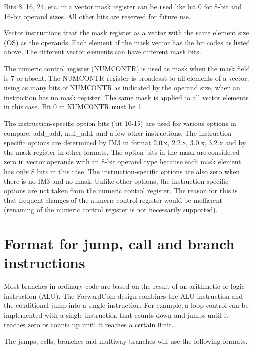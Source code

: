 \documentclass[forwardcom.tex]{subfiles}
\begin{document}
Bits 8, 16, 24, etc. in a vector mask register can be used like bit 0 for 8-bit and 16-bit operand sizes. All other bits are reserved for future use.
\vspace{2mm}

Vector instructions treat the mask register as a vector with the same element size (OS) as the operands. Each element of the mask vector has the bit codes as listed above. The different vector elements can have different mask bits.
\vspace{2mm}

The numeric control register (NUMCONTR) is used as mask when the mask field is 7 or absent. The NUMCONTR register is broadcast to all elements of a vector, using as many bits of NUMCONTR as indicated by the operand size, when an instruction has no mask register. 
The same mask is applied to all vector elements in this case. 
Bit 0 in NUMCONTR must be 1.
\vspace{2mm}

The instruction-specific option bits (bit 10-15) are used for various options in compare, add\_add, mul\_add, and a few other instructions. The instruction-specific options are determined by IM3 in format 2.0.x, 2.2.x, 3.0.x, 3.2.x and by the mask register in other formats. The option bits in the mask are considered zero in vector operands with an 8-bit operand type because each mask element has only 8 bits in this case. The instruction-specific options are also zero when there is no IM3 and no mask. Unlike other options, the instruction-specific options are not taken from the numeric control register. The reason for this is that frequent changes of the numeric control register would be inefficient (renaming of the numeric control register is not necessarily supported).


\section{Format for jump, call and branch instructions}
Most branches in ordinary code are based on the result of an arithmetic or logic instruction (ALU). The ForwardCom design combines the ALU instruction and the conditional jump into a single instruction. For example, a loop control can be implemented with a single instruction that counts down and jumps until it reaches zero or counts up until it reaches a certain limit.
\vspace{2mm}

The jumps, calls, branches and multiway branches will use the following formats.
\end{document}
